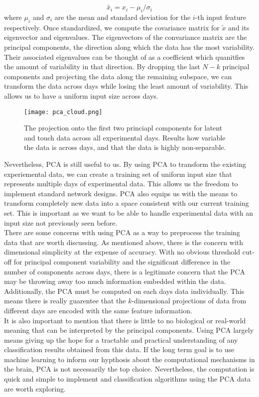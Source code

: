 \documentclass[12pt]{article}
\begin{document}
$$ \tilde{x_i} = x_i - \mu_i / \sigma_i $$
where $\mu_i$ and $\sigma_i$ are the mean and standard deviation for the $i$-th input feature respectively. Once standardized, we compute the covariance matrix for $\tilde{x}$ and its eigenvector and eigenvalues. The eigenvectors of the convariance matrix are the principal components, the direction along which the data has the most variability. Their associated eigenvalues can be thought of as a coefficient which quanitfies the amount of variability in that direction. By dropping the last $N-k$ principal components and projecting the data along the remaining subspace, we can transform the data across days while losing the least amount of variability. This allows us to have a uniform input size across days. \\
 \begin{figure}
   \centering
  \texttt{[image: pca\_cloud.png]}
  \caption{The projection onto the first two princiapl components for latent and touch data across all experimental days. Results how variable the data is across days, and that the data is highly non-separable.}
  \label{ref:pca_cloud}
  \end{figure}
Nevertheless, PCA is still useful to us. By using PCA to transform the existing experiemental data, we can create a training set of uniform input size that represents multiple days of experimental data. This allows us the freedom to implement standard network designs. PCA also equips us with the means to transform completely new data into a space consistent with our current training set. This is important as we want to be able to handle experimental data with an input size not previously seen before. \\
\indent There are some concerns with using PCA as a way to preprocess the training data that are worth discussing. As mentioned above, there is the concern with  dimensional simplicity at the expense of accuracy. With no obvious threshold cut-off for principal component variability and the significant difference in the number of components across days, there is a legitimate concern that the PCA may be throwing away too much information embedded within the data. Additionally, the PCA must be computed on each days data individually. This means there is really guarentee that the $k$-dimensional projections of data from different days are encoded with the same feature information.\\
 \indent It is also important to mention that there is little to no biological or real-world meaning that can be interpreted by the principal components. Using PCA largely means giving up the hope for a tractable and practical understanding of any classification results obtained from this data. If the long term goal is to use machine learning to inform our hypthosis about the computational mechanisms in the brain, PCA is not necessarily the top choice. Nevertheless, the computation is quick and simple to implement and classification algorithms using the PCA data are worth exploring. \\
\end{document}
